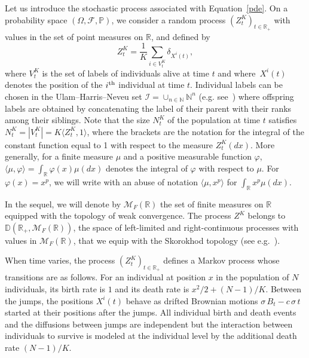 \documentclass[10pt]{amsart}
\theoremstyle{definition}\newtheorem{defi}[theo]{Definition}\newtheorem{rema}[theo]{Remark}\newtheorem{exam}[theo]{Example}\newtheorem{exem}[theo]{Example}\newtheorem{nota}[theo]{Notation}
\newcommand{\Fo}{\mathcal{F}}
\newcommand{\Io}{\mathcal{I}}
\newcommand{\Mo}{\mathcal{M}}
\newcommand*\D{\mathbb{D}}
\newcommand*\N{\mathbb{N}}
\renewcommand*\P{\mathbb{P}}
\newcommand*\R{\mathbb{R}}
\begin{document}
Let us introduce the stochastic process associated with Equation~\eqref{pde}. On a probability space $(\Omega,\Fo,\P)$, we consider a random process $(Z^{K}_{t})_{t\in \R_{+}}$ with values in the set of point measures on $\R$, and defined by
\begin{equation}
Z^{K}_{t} = \frac{1}{K} \sum_{i\in V^K_t} \delta_{X^i(t)},\label{def:ZK}
\end{equation}
where $V^K_t$ is the set of labels of individuals alive at time $t$ and where $\,X^i(t)$ denotes the position of the $i^{\rm th}$ individual at time $t$. Individual labels can be chosen in the Ulam--Harris--Neveu set $ \Io = \cup_{n\in\N}\N^n$ (e.g. see~\cite{legall}) where offspring labels are obtained by concatenating the label of their parent with their ranks among their siblings. Note that the size $N^K_t$ of the population at time $t$ satisfies $N^K_t= |V^K_t|=K \langle Z^{K}_t,1\rangle$, where the brackets are the notation for the integral of the constant function equal to 1 with respect to the measure $Z^K_t(dx)$. More generally, for a finite measure $\mu$ and a positive measurable function $\varphi$, $\langle \mu, \varphi\rangle=\int_{\R}\varphi(x)\mu(dx)$ denotes the integral of $\varphi$ with respect to $\mu$. For $\varphi(x)=x^p$, we will write with an abuse of notation $\langle \mu, x^p\rangle$ for $\int_\R x^p \mu(dx)$.

In the sequel, we will denote by $\Mo_{F}(\R)$ the set of finite measures on $\R$ equipped with the topology of weak convergence. The process $Z^K$ belongs to $\D(\R_+,\Mo_{F}(\R))$, the space of left-limited and right-continuous processes with values in $\Mo_{F}(\R)$, that we equip with the Skorokhod topology (see e.g.~\cite{billingsley_convergence_1999}).

When time varies, the process $(Z^{K}_{t})_{t \in\R_{+}}$ defines a Markov process whose transitions are as follows. For an individual at position $x$ in the population of $N$ individuals, its birth rate is $1$ and its death rate is $x^2/2 + (N-1)/K$. Between the jumps, the positions $X^i(t)$ behave as drifted Brownian motions $\sigma\,B_{t}- c\,\sigma\,t$ started at their positions after the jumps. All individual birth and death events and the diffusions between jumps are independent but the interaction between individuals to survive is modeled at the individual level by the additional death rate $(N-1)/K$.
\end{document}
